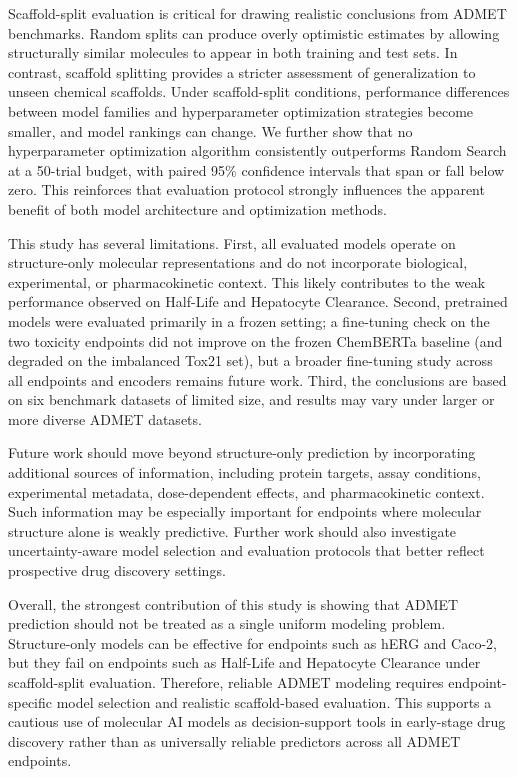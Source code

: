 \documentclass[journal]{IEEEtran}
\begin{document}
Scaffold-split evaluation is critical for drawing realistic conclusions from ADMET benchmarks. Random splits can produce overly optimistic estimates by allowing structurally similar molecules to appear in both training and test sets. In contrast, scaffold splitting provides a stricter assessment of generalization to unseen chemical scaffolds. Under scaffold-split conditions, performance differences between model families and hyperparameter optimization strategies become smaller, and model rankings can change. We further show that no hyperparameter optimization algorithm consistently outperforms Random Search at a 50-trial budget, with paired 95\% confidence intervals that span or fall below zero. This reinforces that evaluation protocol strongly influences the apparent benefit of both model architecture and optimization methods.

This study has several limitations. First, all evaluated models operate on structure-only molecular representations and do not incorporate biological, experimental, or pharmacokinetic context. This likely contributes to the weak performance observed on Half-Life and Hepatocyte Clearance. Second, pretrained models were evaluated primarily in a frozen setting; a fine-tuning check on the two toxicity endpoints did not improve on the frozen ChemBERTa baseline (and degraded on the imbalanced Tox21 set), but a broader fine-tuning study across all endpoints and encoders remains future work. Third, the conclusions are based on six benchmark datasets of limited size, and results may vary under larger or more diverse ADMET datasets.

Future work should move beyond structure-only prediction by incorporating additional sources of information, including protein targets, assay conditions, experimental metadata, dose-dependent effects, and pharmacokinetic context. Such information may be especially important for endpoints where molecular structure alone is weakly predictive. Further work should also investigate uncertainty-aware model selection and evaluation protocols that better reflect prospective drug discovery settings.

Overall, the strongest contribution of this study is showing that ADMET prediction should not be treated as a single uniform modeling problem. Structure-only models can be effective for endpoints such as hERG and Caco-2, but they fail on endpoints such as Half-Life and Hepatocyte Clearance under scaffold-split evaluation. Therefore, reliable ADMET modeling requires endpoint-specific model selection and realistic scaffold-based evaluation. This supports a cautious use of molecular AI models as decision-support tools in early-stage drug discovery rather than as universally reliable predictors across all ADMET endpoints.
\end{document}
